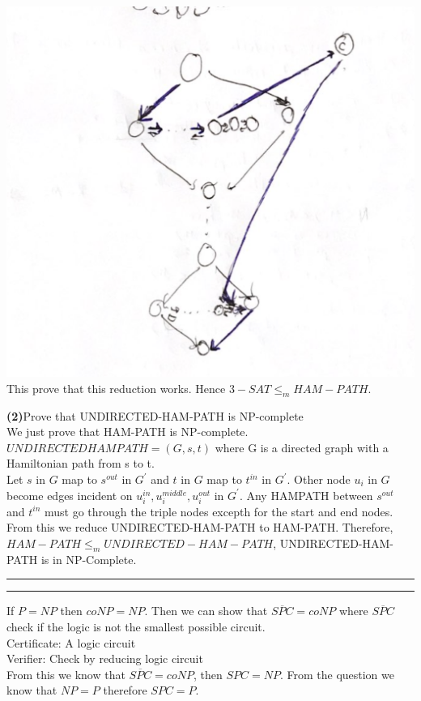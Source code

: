 \documentclass[a4paper, 11pt]{article}
\newcommand{\question}[2] {\vspace{.25in} \hrule\vspace{0.5em}
\noindent{\bf #1: #2} \vspace{0.5em}
\hrule \vspace{.10in}}
\renewcommand{\part}[1] {\vspace{.10in} {\bf (#1)}}
\begin{document}
\includegraphics[width=\textwidth]{Q4-3.png}\\
This prove that this reduction works. Hence $3-SAT \leq_m HAM-PATH$.

\part{2}{Prove that UNDIRECTED-HAM-PATH is NP-complete}\\
We just prove that HAM-PATH is NP-complete.\\
$UNDIRECTEDHAMPATH = (G,s,t)$ where G is a directed graph with a Hamiltonian path from s to t.\\ 
Let $s$ in $G$ map to $s^{out}$ in $G^{'}$ and $t$ in $G$ map to $t^{in}$ in $G^{'}$. Other node $u_i$ in $G$ become edges incident on $u_i^{in}, u_i^{middle}, u_i^{out}$ in $G^{'}$. Any HAMPATH between $s^{out}$ and $t^{in}$ must go through the triple nodes excepth for the start and end nodes. From this we reduce UNDIRECTED-HAM-PATH to HAM-PATH. Therefore, $HAM-PATH \leq_m UNDIRECTED-HAM-PATH$, UNDIRECTED-HAM-PATH is in NP-Complete.

\question{5}{Silver Lining If P = NP}
If $P = NP$ then $coNP = NP$. Then we can show that $\overline{SPC} = coNP$ where $\overline{SPC}$ check if the logic is not the smallest possible circuit.\\
Certificate: A logic circuit\\
Verifier: Check by reducing logic circuit\\
From this we know that $\overline{SPC} = coNP$, then $SPC = NP$. From the question we know that $NP = P$ therefore $SPC = P$.
\end{document}
